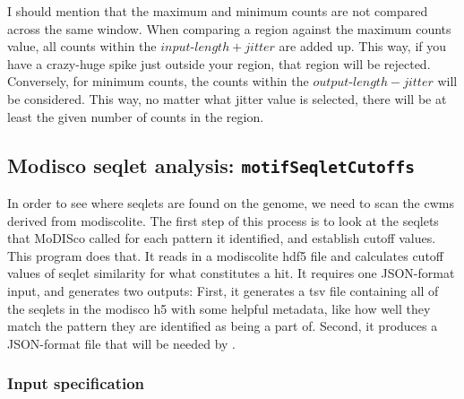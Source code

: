 \documentclass{article}
\begin{document}
I should mention that the maximum and minimum counts are not compared across the
same window.
When comparing a region against the maximum counts value, all counts within the
$input\mbox{-}length + jitter$ are added up.
This way, if you have a crazy-huge spike just outside your region, that region
will be rejected.
Conversely, for minimum counts, the counts within the
$output\mbox{-}length - jitter$ will be considered.
This way, no matter what jitter value is selected, there will be at least the
given number of counts in the region.


\newpage

\subsection{Modisco seqlet analysis: \texttt{motifSeqletCutoffs}}\label{prog:motifSeqletCutoffs}
In order to see where seqlets are found on the genome, we need to scan the cwms
derived from modiscolite.
The first step of this process is to look at the seqlets that MoDISco called for
each pattern it identified, and establish cutoff values.
This program does that.
It reads in a modiscolite hdf5 file and calculates cutoff values of seqlet
similarity for what constitutes a hit.
It requires one JSON-format input, and generates two outputs: First, it
generates a tsv file containing all of the seqlets in the modisco h5 with some
helpful metadata, like how well they match the pattern they are identified
as being a part of.
Second, it produces a JSON-format file that will be needed
by .

\subsubsection{Input specification}

\end{document}
